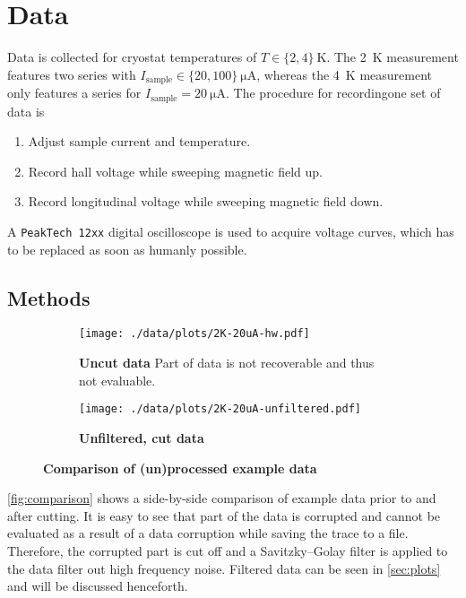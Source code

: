 \chapter{Data}
Data is collected for cryostat temperatures of $T\in\{ 2,4\}\ \si{\kelvin}$.
The \SI{2}{\kelvin} measurement features two series with $I_\text{sample}\in\{ 20,100\}\ \si{\micro\ampere}$, whereas the \SI{4}{\kelvin} measurement only features a series for $I_\text{sample}=\SI{20}{\micro\ampere}$.
The procedure for recordingone set of data is
\begin{enumerate}
	\item Adjust sample current and temperature.
	\item Record hall voltage while sweeping magnetic field up.
	\item Record longitudinal voltage while sweeping magnetic field down.
\end{enumerate}
A \texttt{PeakTech 12xx} digital oscilloscope is used to acquire voltage curves, which has to be replaced as soon as humanly possible.

\section{Methods} %
\begin{figure}
	\centering
	\begin{subfigure}{.48\textwidth}
		\centering
		\texttt{[image: ./data/plots/2K-20uA-hw.pdf]}
		\caption{\textbf{Uncut data} Part of data is not recoverable and thus not evaluable.}
	\end{subfigure}
	\hspace*{\fill}
	\begin{subfigure}{.48\textwidth}
		\centering
		\texttt{[image: ./data/plots/2K-20uA-unfiltered.pdf]}
		\caption{\textbf{Unfiltered, cut data}}
	\end{subfigure}
	\caption[Comparison of (un)processed example data]{\textbf{Comparison of (un)processed example data}}
	\label{fig:comparison}
\end{figure}
\autoref{fig:comparison} shows a side-by-side comparison of example data prior to and after cutting.
It is easy to see that part of the data is corrupted and cannot be evaluated as a result of a data corruption while saving the trace to a file.
Therefore, the corrupted part is cut off and a Savitzky–Golay filter is applied to the data filter out high frequency noise.
Filtered data can be seen in \autoref{sec:plots} and will be discussed henceforth.


